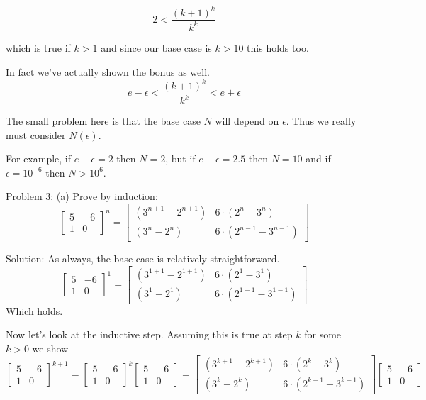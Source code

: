 \documentclass[16 pt]{amsart}
\theoremstyle{definition}
\theoremstyle{remark}
\numberwithin{equation}{subsection}
\begin{document}
\[
2 < \frac{(k+1)^k}{k^k}
\]

which is true if $k>1$ and since our base case is $k>10$ this holds too.

In fact we've actually shown the bonus as well.
\[
e - \epsilon < \frac{(k+1)^k}{k^k} < e + \epsilon
\]


The small problem here is that the base case $N$ will depend on $\epsilon$.  Thus we really must consider $N(\epsilon)$.

For example, if $e - \epsilon = 2$ then $N=2$, but if $e-\epsilon = 2.5$ then $N=10$ and if $\epsilon = 10^{-6}$
then $N > 10^6 $.


\newpage

Problem 3: (a) Prove by induction:
\[
\begin{bmatrix}
5 & -6 \\
1 & 0
\end{bmatrix}^n = 
\begin{bmatrix}
(3^{n+1}-2^{n+1}) & 6\cdot(2^n- 3^n) \\
(3^n-2^n) & 6\cdot(2^{n-1}-3^{n-1})\end{bmatrix}
\]

\vspace{.5in}

Solution:  As always, the base case is relatively straightforward.
\[
\begin{bmatrix}
5 & -6 \\
1 & 0
\end{bmatrix}^1 = 
\begin{bmatrix}
(3^{1+1}-2^{1+1}) & 6\cdot(2^1- 3^1) \\
(3^1-2^1) & 6\cdot(2^{1-1}-3^{1-1})\end{bmatrix}
\]
Which holds.


Now let's look at the inductive step.  Assuming this is true at step $k$ for some $k>0$ we show
\[
\begin{bmatrix}
5 & -6 \\
1 & 0
\end{bmatrix}^{k+1} =
\begin{bmatrix}
5 & -6 \\
1 & 0
\end{bmatrix}^k  
\begin{bmatrix}
5 & -6 \\
1 & 0
\end{bmatrix} = 
\begin{bmatrix}
(3^{k+1}-2^{k+1}) & 6\cdot(2^k- 3^k) \\
(3^k-2^k) & 6\cdot(2^{k-1}-3^{k-1})\end{bmatrix}
\begin{bmatrix}
5 & -6 \\
1 & 0
\end{bmatrix} 
\]
\end{document}
